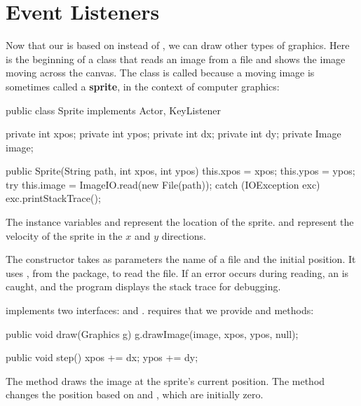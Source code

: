 \section{Event Listeners}


Now that our  is based on  instead of , we can draw other types of graphics.
Here is the beginning of a class that reads an image from a file and shows the image moving across the canvas.
The class is called  because a moving image is sometimes called a {\bf sprite}, in the context of computer graphics:

\begin{code}
public class Sprite implements Actor, KeyListener {
    private int xpos;
    private int ypos;
    private int dx;
    private int dy;
    private Image image;

    public Sprite(String path, int xpos, int ypos) {
        this.xpos = xpos;
        this.ypos = ypos;
        try {
            this.image = ImageIO.read(new File(path));
        } catch (IOException exc) {
            exc.printStackTrace();
        }
    }
}
\end{code}

The instance variables  and  represent the location of the sprite.
 and  represent the velocity of the sprite in the $x$ and $y$ directions.


The constructor takes as parameters the name of a file and the initial position.
It uses , from the  package, to read the file.
If an error occurs during reading, an  is caught, and the program displays the stack trace for debugging.

 implements two interfaces:  and .
 requires that we provide  and  methods:

\begin{code}
    public void draw(Graphics g) {
        g.drawImage(image, xpos, ypos, null);
    }

    public void step() {
        xpos += dx;
        ypos += dy;
    }
\end{code}

The  method draws the image at the sprite's current position.
The  method changes the position based on  and , which are initially zero.

